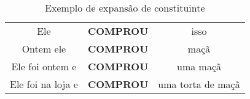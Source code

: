 \begin{table}[!ht]
    \centering
    \begin{tabular}{ c c c }
        Ele & \textbf{COMPROU} & isso \\ 
        Ontem ele & \textbf{COMPROU} & maçã \\  
        Ele foi ontem e & \textbf{COMPROU} & uma maçã \\
        Ele foi na loja e & \textbf{COMPROU} & uma torta de maçã
    \end{tabular}
    \caption{Exemplo de expansão de constituinte}
    \label{tab:rel_sintagma}
\end{table}